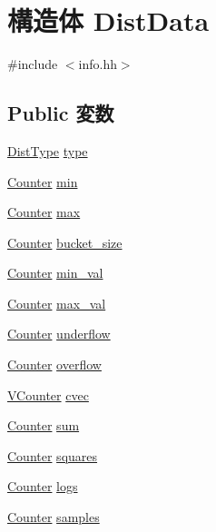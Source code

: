 \hypertarget{structStats_1_1DistData}{
\section{構造体 DistData}
\label{structStats_1_1DistData}
}


{\ttfamily \#include $<$info.hh$>$}\subsection*{Public 変数}
\begin{DoxyCompactItemize}
\item 
\hyperlink{namespaceStats_a1d00be67865ecfaa5774f566d76a6876}{DistType} \hyperlink{structStats_1_1DistData_ae3815d58610a170fac9494df971f9e75}{type}
\item 
\hyperlink{namespaceStats_ac35128c026c72bb36af9cea00774e8a6}{Counter} \hyperlink{structStats_1_1DistData_a6205e1c26a829364bc95a93283f20e22}{min}
\item 
\hyperlink{namespaceStats_ac35128c026c72bb36af9cea00774e8a6}{Counter} \hyperlink{structStats_1_1DistData_af81be55c0ee79705d7fee6179089b184}{max}
\item 
\hyperlink{namespaceStats_ac35128c026c72bb36af9cea00774e8a6}{Counter} \hyperlink{structStats_1_1DistData_acf3483d9fb89e37ad01724a4428b3dd2}{bucket\_\-size}
\item 
\hyperlink{namespaceStats_ac35128c026c72bb36af9cea00774e8a6}{Counter} \hyperlink{structStats_1_1DistData_a99ee5c8f5894036e88e7d30de9fa4211}{min\_\-val}
\item 
\hyperlink{namespaceStats_ac35128c026c72bb36af9cea00774e8a6}{Counter} \hyperlink{structStats_1_1DistData_a9791349c8134f44e46aa7688b0a9e92b}{max\_\-val}
\item 
\hyperlink{namespaceStats_ac35128c026c72bb36af9cea00774e8a6}{Counter} \hyperlink{structStats_1_1DistData_af9e29e4a48415bdab1a3273284c1f7d2}{underflow}
\item 
\hyperlink{namespaceStats_ac35128c026c72bb36af9cea00774e8a6}{Counter} \hyperlink{structStats_1_1DistData_a25f45345808703e64848f43dd7aa9ee7}{overflow}
\item 
\hyperlink{classstd_1_1vector}{VCounter} \hyperlink{structStats_1_1DistData_a8cc2f3a565a2e54ab797f717802bc894}{cvec}
\item 
\hyperlink{namespaceStats_ac35128c026c72bb36af9cea00774e8a6}{Counter} \hyperlink{structStats_1_1DistData_ab5b201cce7e10c48f62b71605e75707e}{sum}
\item 
\hyperlink{namespaceStats_ac35128c026c72bb36af9cea00774e8a6}{Counter} \hyperlink{structStats_1_1DistData_a0c02ec1e072d692448ce4429a78e3675}{squares}
\item 
\hyperlink{namespaceStats_ac35128c026c72bb36af9cea00774e8a6}{Counter} \hyperlink{structStats_1_1DistData_a8bbd10a9b5009b4ca5f2709c9dfcb684}{logs}
\item 
\hyperlink{namespaceStats_ac35128c026c72bb36af9cea00774e8a6}{Counter} \hyperlink{structStats_1_1DistData_ab4db99aba3dd28686061dd3d5475b3bd}{samples}
\end{DoxyCompactItemize}


